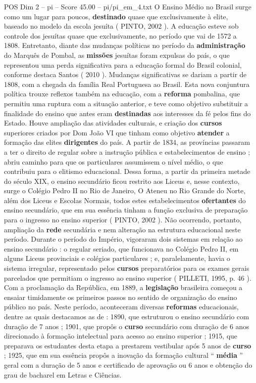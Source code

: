 \begin{textsample}{POS Dim 2 – pi – Score 45.00 – pi/pi\_em\_4.txt}
O Ensino Médio no Brasil surge como um lugar para poucos, \textbf{destinado} quase que exclusivamente à elite, baseado no modelo da escola jesuíta ( PINTO, 2002 ).
A educação esteve sob controle dos jesuítas quase que exclusivamente, no período que vai de 1572 a 1808.
Entretanto, diante das mudanças políticas no período da \textbf{administração} do Marquês de Pombal, as \textbf{missões} jesuítas foram expulsas do país, o que representou uma perda significativa para a educação formal do Brasil colonial, conforme destaca Santos ( 2010 ).
Mudanças significativas se dariam a partir de 1808, com a chegada da família Real Portuguesa ao Brasil.
Esta nova conjuntura política trouxe reflexos também na educação, com a \textbf{reforma} pombalina, que permitiu uma ruptura com a situação anterior, e teve como objetivo substituir a finalidade do ensino que antes eram \textbf{destinadas} aos interesses da fé pelos fins do Estado.
Houve ampliação das atividades culturais, e criação dos \textbf{cursos} superiores criados por Dom João VI que tinham como objetivo \textbf{atender} a formação das elites \textbf{dirigentes} do país.
A partir de 1834, as províncias passaram a ter o direito de regular sobre a instrução pública e estabelecimentos de ensino ; abriu caminho para que os particulares assumissem o nível médio, o que contribuiu para o elitismo educacional.
Dessa forma, a partir da primeira metade do século XIX, o ensino secundário ficou restrito aos Liceus e, nesse contexto, surge o Colégio Pedro II no Rio de Janeiro, O Ateneu no Rio Grande do Norte, além dos Liceus e Escolas Normais, todos estes estabelecimentos \textbf{ofertantes} do ensino secundário, que em sua essência tinham a função exclusiva de preparação para o ingresso no ensino superior ( PINTO, 2002 ).
Não ocorrendo, portanto, ampliação da \textbf{rede} secundária e nem alteração na estrutura educacional neste período.
Durante o período do Império, vigoraram dois sistemas em relação ao ensino secundário : o regular seriado, que funcionava no Colégio Pedro II, em alguns Liceus provinciais e colégios particulares ; e, paralelamente, havia o sistema irregular, representado pelos \textbf{cursos} preparatórios para os exames gerais parcelados que permitiam o ingresso ao ensino superior ( PILLETI, 1995, p. 46 ).
Com a proclamação da República, em 1889, a \textbf{legislação} brasileira começou a ensaiar timidamente os primeiros passos no sentido de organização do ensino público no país.
Neste período, aconteceram diversas \textbf{reformas} educacionais, dentre as quais destacamos as de : 1890, que estruturou o ensino secundário com duração de 7 anos ; 1901, que propôs o \textbf{curso} secundário com duração de 6 anos direcionado à formação intelectual para acesso ao ensino superior ; 1915, que preparava os estudantes desta etapa a prestarem vestibular após 5 anos de \textbf{curso} ; 1925, que em sua essência propôs a inovação da formação cultural “ \textbf{média} ” geral com a duração de 5 anos e certificado de aprovação ou 6 anos e obtenção do grau de bacharel em Letras e Ciências.

\end{textsample}
